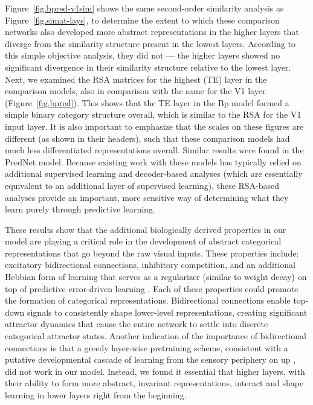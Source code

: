 \documentclass[11pt,twoside]{article}
\newif\myifpdf
\begin{document}
Figure~\ref{fig.bpred-v1sim} shows the same second-order similarity analysis as Figure~\ref{fig.simat-lays}, to determine the extent to which these comparison networks also developed more abstract representations in the higher layers that diverge from the similarity structure present in the lowest layers.  According to this simple objective analysis, they did not --- the higher layers showed no significant divergence in their similarity structure relative to the lowest layer.  Next, we examined the RSA matrices for the highest (TE) layer in the comparison models, also in comparison with the same for the V1 layer (Figure~\ref{fig.bpred}).  This shows that the TE layer in the Bp model formed a simple binary category structure overall, which is similar to the RSA for the V1 input layer.  It is also important to emphasize that the scales on these figures are different (as shown in their headers), such that these comparison models had much less differentiated representations overall.  Similar results were found in the PredNet model.  Because existing work with these models has typically relied on additional supervised learning and decoder-based analyses (which are essentially equivalent to an additional layer of supervised learning), these RSA-based analyses provide an important, more sensitive way of determining what they learn purely through predictive learning.

These results show that the additional biologically derived properties in our model are playing a critical role in the development of abstract categorical representations that go beyond the raw visual inputs. These properties include: excitatory bidirectional connections, inhibitory competition, and an additional Hebbian form of learning that serves as a regularizer (similar to weight decay) on top of predictive error-driven learning \citep{OReilly98,OReillyMunakata00}.  Each of these properties could promote the formation of categorical representations. Bidirectional connections enable top-down signals to consistently shape lower-level representations, creating significant attractor dynamics that cause the entire network to settle into discrete categorical attractor states.  Another indication of the importance of bidirectional connections is that a greedy layer-wise pretraining scheme, consistent with a putative developmental cascade of learning from the sensory periphery on up \citep{ShragerJohnson96,BengioYaoAlainEtAl13,Valpola14,HintonSalakhutdinov06}, did not work in our model. Instead, we found it essential that higher layers, with their ability to form more abstract, invariant representations, interact and shape learning in lower layers right from the beginning.
\end{document}
